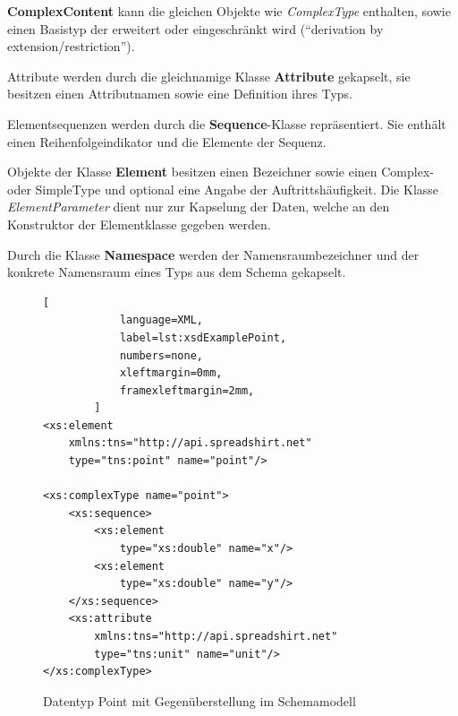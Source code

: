 \textbf{ComplexContent} kann die gleichen Objekte wie \emph{ComplexType} enthalten, sowie einen Basistyp der erweitert oder eingeschränkt wird (\enquote{derivation by extension/restriction}).

Attribute werden durch die gleichnamige Klasse \textbf{Attribute} gekapselt, sie besitzen einen Attributnamen sowie eine Definition ihres Typs.

Elementsequenzen werden durch die \textbf{Sequence}-Klasse repräsentiert. Sie enthält einen Reihenfolgeindikator und die Elemente der Sequenz.

Objekte der Klasse \textbf{Element} besitzen einen Bezeichner sowie einen Complex- oder SimpleType und optional eine Angabe der Auftrittshäufigkeit. Die Klasse \emph{ElementParameter} dient nur zur Kapselung der Daten, welche an den Konstruktor der Elementklasse gegeben werden.

Durch die Klasse \textbf{Namespace} werden der Namensraumbezeichner und der konkrete Namensraum eines Typs aus dem Schema gekapselt. 

\begin{figure}[ht]
    \centering
    \begin{minipage}[b]{0.6\linewidth}
        \begin{lstlisting}[
            language=XML,
            label=lst:xsdExamplePoint,                
            numbers=none,
            xleftmargin=0mm,
            framexleftmargin=2mm,
        ]
<xs:element 
    xmlns:tns="http://api.spreadshirt.net" 
    type="tns:point" name="point"/>

<xs:complexType name="point">
    <xs:sequence>
        <xs:element 
            type="xs:double" name="x"/>
        <xs:element 
            type="xs:double" name="y"/>
    </xs:sequence>
    <xs:attribute 
        xmlns:tns="http://api.spreadshirt.net" 
        type="tns:unit" name="unit"/>
</xs:complexType>
        \end{lstlisting}
    \end{minipage}
    \quad    
    \begin{minipage}[b]{0.35\linewidth}
    \end{minipage}
    \caption{Datentyp Point mit Gegenüberstellung im Schemamodell}
\end{figure}